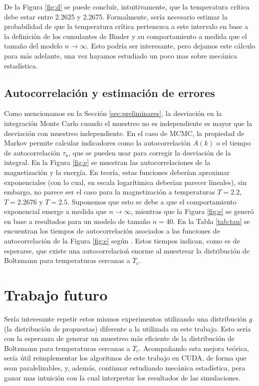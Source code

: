 \documentclass[a4paper,12pt]{article}
\begin{document}
De la Figura \ref{fig:d} se puede concluír, intuitivamente, que la temperatura crítica debe estar entre 2.2625 y 2.2675. Formalmente, sería necesario estimar la probabilidad de que la temperatura crítica pertenezca a este intervalo en base a la definición de los cumulantes de Binder y su comportamiento a medida que el tamaño del modelo $n \to \infty$. Esto podría ser interesante, pero dejamos este cálculo para más adelante, una vez hayamos estudiado un poco mas sobre mecánica estadística.

\subsection{Autocorrelación y estimación de errores}

Como mencionamos en la Sección \ref{sec:preliminares}, la desviación en la integración Monte Carlo cuando el muestreo no es independiente es mayor que la desviación con muestreo independiente. En el caso de MCMC, la propiedad de Markov permite calcular indicadores como la autocorrelación $A(k)$ o el tiempo de autocorrelación $\tau_a$, que se pueden usar para corregir la desviación de la integral. En la Figura \ref{fig:e} se muestran las autocorrelaciones de la magnetización y la energía. En teoría, estas funciones deberían aproximar exponenciales (con lo cual, en escala logarítimica deberían parecer lineales), sin embargo, no parece ser el caso para la magnetización a temperaturas $T = 2.2$, $T = 2.2676$ y $T = 2.5$. Suponemos que esto se debe a que el comportamiento exponencial emerge a medida que $n \to \infty$, mientras que la Figura \ref{fig:e} se generó en base a resultados para un modelo de tamaño $n = 40$. En la Tabla \ref{tab:tau} se encuentran los tiempos de autocorrelación asociados a las funciones de autocorrelación de la Figura \ref{fig:e} según \cite{janke2009statistical,schachinger2007mcmc}. Estos tiempos indican, como es de esperarse, que existe una autocorrelacioń enorme al muestrear la distribución de Boltzmann para temperaturas cercanas a $T_c$.

\section{Trabajo futuro}

Sería interesante repetir estos mismos experimentos utilizando una distribución $g$ (la distribución de propuestas) diferente a la utilizada en este trabajo. Esto sería con la esperanza de generar un muestreo más eficiente de la distribución de Boltzmann para temperaturas cercanas a $T_c$. Acompañando esta mejora teórica, sería útil reimplementar los algoritmos de este trabajo en CUDA, de forma que sean paralelizables, y, además, continuar estudiando mecánica estadística, pera ganar mas intuición con la cual interpretar los resultados de las simulaciones.\\
\end{document}
